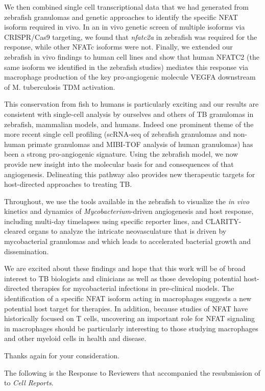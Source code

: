 We then combined single cell transcriptional data that we had generated from zebrafish granulomas and genetic approaches to identify the specific NFAT isoform required in vivo. In an in vivo genetic screen of multiple isoforms via CRISPR/Cas9 targeting, we found that \textit{nfatc2a} in zebrafish was required for the response, while other NFATc isoforms were not. Finally, we extended our zebrafish in vivo findings to human cell lines and show that human NFATC2 (the same isoform we identified in the zebrafish studies) mediates this response via macrophage production of the key pro-angiogenic molecule VEGFA downstream of M. tuberculosis TDM activation. 

This conservation from fish to humans is particularly exciting and our results are consistent with single-cell analysis by ourselves and others of TB granulomas in zebrafish, mammalian models, and humans. Indeed one prominent theme of the more recent single cell profiling (scRNA-seq of zebrafish granulomas and non-human primate granulomas and MIBI-TOF analysis of human granulomas) has been a strong pro-angiogenic signature. Using the zebrafish model, we now provide new insight into the molecular basis for and consequences of that angiogenesis. Delineating this pathway also provides new therapeutic targets for host-directed approaches to treating TB.

Throughout, we use the tools available in the zebrafish to visualize the \textit{in vivo} kinetics and dynamics of \textit{Mycobacterium}-driven angiogenesis and host response, including multi-day timelapses using specific reporter lines, and CLARITY-cleared organs to analyze the intricate neovasculature that is driven by mycobacterial granulomas and which leads to accelerated bacterial growth and dissemination.

We are excited about these findings and hope that this work will be of broad interest to TB biologists and clinicians as well as those developing potential host-directed therapies for mycobacterial infections in pre-clinical models. The identification of a specific NFAT isoform acting in macrophages suggests a new potential host target for therapies. In addition, because studies of NFAT have historically focused on T cells, uncovering an important role for NFAT signaling in macrophages should be particularly interesting to those studying macrophages and other myeloid cells in health and disease.

Thanks again for your consideration.

The following is the Response to Reviewers that accompanied the resubmission of \citet{Brewer2022} to \textit{Cell Reports}.


